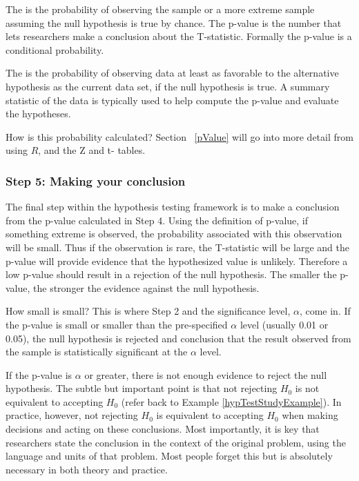 The  is the probability of observing the sample or a more extreme sample assuming the null hypothesis is true by chance. The p-value is the number that lets researchers make a conclusion about the T-statistic. Formally the p-value is a conditional probability.

\begin{termBox}{
The  is the probability of observing data at least as favorable to the alternative hypothesis as the current data set, if the null hypothesis is true. A summary statistic of the data is typically used to help compute the p-value and evaluate the hypotheses.}
\end{termBox}

How is this probability calculated? Section ~\ref{pValue} will go into more detail from using $R$, and the Z and t- tables. 

\subsubsection{Step 5: Making your conclusion}
The final step within the hypothesis testing framework is to make a conclusion from the p-value calculated in Step 4. Using the definition of p-value, if something extreme is observed, the probability associated with this observation will be small. Thus if the observation is rare, the T-statistic will be large and the p-value will provide evidence that the hypothesized value is unlikely. Therefore a low p-value should result in a rejection of the null hypothesis. The smaller the p-value, the stronger the evidence against the null hypothesis. 

How small is small? This is where Step 2 and the significance level, $\alpha$, come in. If the p-value is small or smaller than the pre-specified $\alpha$ level (usually 0.01 or 0.05),  the null hypothesis is rejected and conclusion that the result observed from the sample is statistically significant at the $\alpha$ level. 

If the p-value is $\alpha$ or greater, there is not enough evidence to reject the null hypothesis. The subtle but important point is that not rejecting $H_0$ is not equivalent to accepting $H_0$ (refer back to Example \ref{hypTestStudyExample}). In practice, however, not rejecting $H_0$ is equivalent to accepting $H_0$ when making decisions and acting on these conclusions. Most importantly, it is key that researchers state the conclusion in the context of the original problem, using the language and units of that problem. Most people forget this but is absolutely necessary in both theory and practice. 


